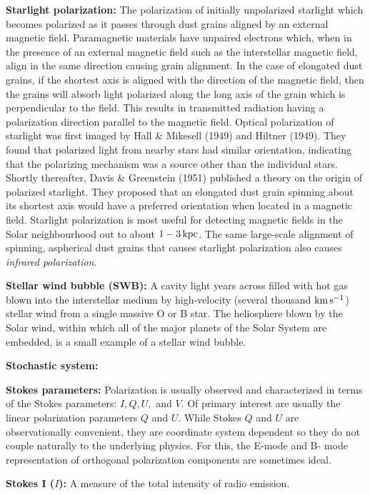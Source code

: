 \documentclass[a4paper,10pt]{article}
\begin{document}
{\noindent}\textbf{Starlight polarization:} The polarization of initially unpolarized starlight which becomes polarized as it passes through dust grains aligned by an external magnetic field. Paramagnetic materials have unpaired electrons which, when in the presence of an external magnetic field such as the interstellar magnetic field, align in the same direction causing grain alignment. In the case of elongated dust grains, if the shortest axis is aligned with the direction of the magnetic field, then the grains will absorb light polarized along the long axis of the grain which is perpendicular to the field. This results in transmitted radiation having a polarization direction parallel to the magnetic field. Optical polarization of starlight was first imaged by Hall \& Mikesell (1949) and Hiltner (1949). They found that polarized light from nearby stars had similar orientation, indicating that the polarizing mechanism was a source other than the individual stars. Shortly thereafter, Davis \& Greenstein (1951) published a theory on the origin of polarized starlight. They proposed that an elongated dust grain spinning about its shortest axis would have a preferred orientation when located in a magnetic field. Starlight polarization is most useful for detecting magnetic fields in the Solar neighbourhood out to about $1-3\,{\rm kpc}$. The same large-scale alignment of spinning, aspherical dust grains that causes starlight polarization also causes \textit{infrared polarization}.

{\noindent}\textbf{Stellar wind bubble (SWB):} A cavity light years across filled with hot gas blown into the interstellar medium by high-velocity (several thousand ${\rm km\,s^{-1}}$) stellar wind from a single massive O or B star. The heliosphere blown by the Solar wind, within which all of the major planets of the Solar System are embedded, is a small example of a stellar wind bubble.

{\noindent}\textbf{Stochastic system:}

{\noindent}\textbf{Stokes parameters:} Polarization is usually observed and characterized in terms of the Stokes parameters: $I, Q, U,$ and $V$. Of primary interest are usually the linear polarization parameters $Q$ and $U$. While Stokes $Q$ and $U$ are observationally convenient, they are coordinate system dependent so they do not couple naturally to the underlying physics. For this, the E-mode and B- mode representation of orthogonal polarization components are sometimes ideal.

{\noindent}\textbf{Stokes I ($I$):} A measure of the total intensity of radio emission.
\end{document}
